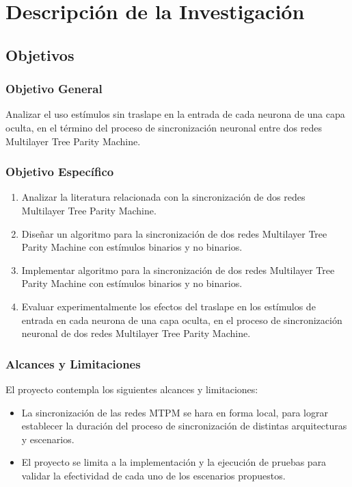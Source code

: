 \chapter{Descripción de la Investigación}
\section{Objetivos}
\subsection{Objetivo General}
Analizar el uso estímulos sin traslape en la entrada de cada
neurona de una capa oculta, en el término del proceso de
sincronización neuronal entre dos redes Multilayer Tree Parity
Machine.
\subsection{Objetivo Específico}
\begin{enumerate}
    \item Analizar la literatura relacionada con la sincronización de dos redes Multilayer Tree Parity Machine.
    \item Diseñar un algoritmo para la sincronización de dos redes Multilayer Tree Parity Machine con estímulos binarios y no binarios.
    \item Implementar algoritmo para la sincronización de dos redes Multilayer Tree Parity Machine con estímulos binarios y no binarios.
    \item Evaluar experimentalmente los efectos del traslape en los estímulos de entrada en cada neurona de una capa oculta, en el proceso de sincronización neuronal de dos redes Multilayer Tree Parity Machine.
\end{enumerate}
\subsection{Alcances y Limitaciones}
El proyecto contempla los siguientes alcances y limitaciones:
\begin{itemize}
    \item La sincronización de las redes MTPM se hara en forma local, para lograr establecer la duración del proceso de sincronización de distintas arquitecturas y escenarios.
    \item El proyecto se limita a la implementación y la ejecución de pruebas para validar la efectividad de cada uno de los escenarios propuestos.
\end{itemize}
